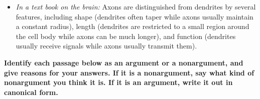 \begin{itemize}

\item \textit{In a text book on the brain:} Axons are distinguished from dendrites by several features, including shape (dendrites often taper while axons usually maintain a constant radius), length (dendrites are restricted to a small region around the cell body while axons can be much longer), and function (dendrites usually receive signals while axons usually transmit them).


\end{itemize}

\textbf{Identify each passage below as an argument or a nonargument, and give reasons for your answers. If it is a nonargument, say what kind of nonargument you think it is. If it is an argument, write it out in canonical form.}


